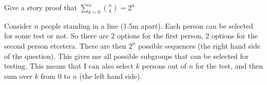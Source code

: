 
\setcounter{theorem}{10}
\begin{exercise}[BH.1.15]
	Give a story proof that $\sum_{k = 0}^n \binom{n}{k} = 2^n$
\begin{solution}
	Consider $n$ people standing in a line (1.5m apart). Each person can be selected for some test or not. So there are 2 options for the first person, 2 options for the second person etcetera. There are then $2^n$ possible sequences (the right hand side of the question). This gives me all possible subgroups that can be selected for testing. This means that I can also select $k$ persons out of $n$ for the test, and then sum over $k$ from $0$ to $n$ (the left hand side).
\end{solution}
\end{exercise}


